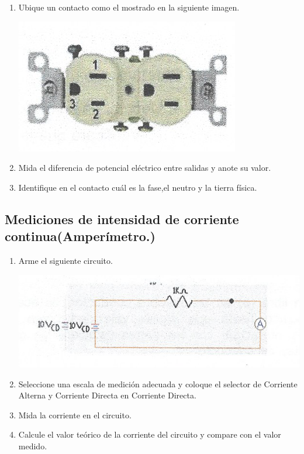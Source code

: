 \documentclass[10pt]{article}
\begin{document}
\begin{multicols}{2}
\begin{enumerate}
	\item Ubique un contacto como el mostrado en la siguiente imagen.
	\begin{center}
		\includegraphics{Imagenes/Fotos/Contacto.png}
	\end{center}
	\item Mida el diferencia de potencial eléctrico entre salidas y anote su valor.
	\item Identifique en el contacto cuál es la fase,el neutro y la tierra física.
\end{enumerate}

\subsection{Mediciones de intensidad de corriente continua(Amperímetro.)}
\begin{enumerate}
	\item Arme el siguiente circuito.
	\begin{center}
		\includegraphics{Imagenes/Fotos/Circuito.png}
	\end{center}
	\item Seleccione una escala de medición adecuada y coloque el selector de Corriente Alterna y Corriente Directa en Corriente Directa.
	\item Mida la corriente en el circuito.
	\item Calcule el valor teórico de la corriente del circuito y compare con el valor medido.
\end{enumerate}


\end{multicols}
\end{document}

